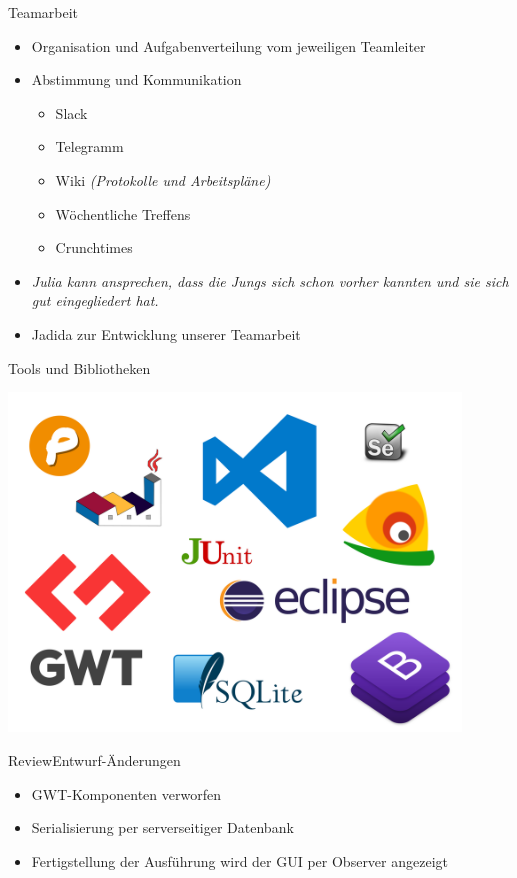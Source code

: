 \documentclass[10pt]{beamer}
\begin{document}
\begin{frame}{Teamarbeit}{}
	\begin{itemize}
		\item Organisation und Aufgabenverteilung vom jeweiligen Teamleiter
		\item Abstimmung und Kommunikation
		\begin{itemize}
			\item Slack
			\item Telegramm
			\item Wiki \textit{(Protokolle und Arbeitspläne)}
			\pause
			\item Wöchentliche Treffens
			\item Crunchtimes
		\end{itemize}
		\pause
		\item \textit{Julia kann ansprechen, dass die Jungs sich schon vorher kannten und sie sich gut eingegliedert hat.}
		\item Jadida zur Entwicklung unserer Teamarbeit
	\end{itemize}
\end{frame}


\begin{frame}{Tools und Bibliotheken}{}
	\begin{center}
    \includegraphics[width=0.9\textwidth]{img/alle}
	\end{center}
\end{frame}

\begin{frame}{Review}{Entwurf-Änderungen}
	\begin{itemize}
		\item GWT-Komponenten verworfen
		\item Serialisierung per serverseitiger Datenbank
		\item Fertigstellung der Ausführung wird der GUI per Observer angezeigt
	\end{itemize}
\end{frame}
\end{document}

